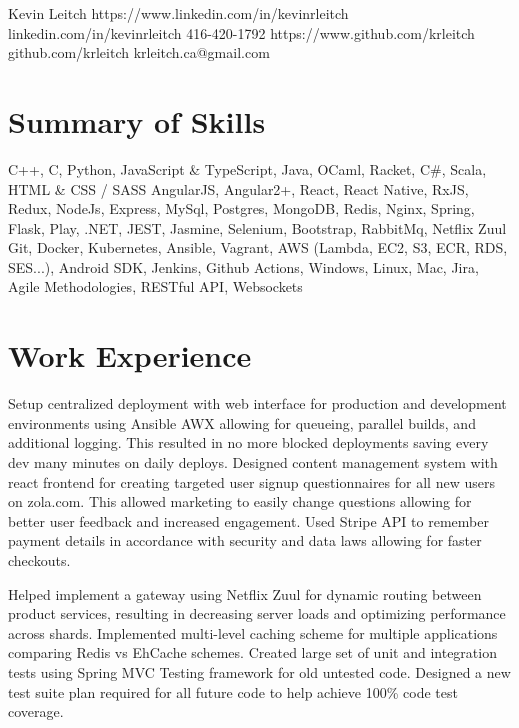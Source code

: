 \documentclass{my_resume}
\begin{document}
\myhead
{Kevin Leitch}
{https://www.linkedin.com/in/kevinrleitch}
{linkedin.com/in/kevinrleitch}
{416-420-1792}
{https://www.github.com/krleitch}
{github.com/krleitch}
{krleitch.ca@gmail.com}


\section{Summary of Skills}
{C++, C, Python, JavaScript \& TypeScript, Java, OCaml, Racket, C\#, Scala, HTML \& CSS / SASS}
{AngularJS, Angular2+, React, React Native, RxJS, Redux, NodeJs, Express, MySql, Postgres,
 MongoDB, Redis, Nginx, Spring, Flask, Play, .NET, JEST, Jasmine, Selenium, Bootstrap, RabbitMq, Netflix Zuul}
{Git, Docker, Kubernetes, Ansible, Vagrant, AWS (Lambda, EC2, S3, ECR, RDS, SES...),
 Android SDK, Jenkins, Github Actions, Windows, Linux, Mac, Jira, Agile Methodologies, RESTful API, Websockets}

\section{Work Experience}

\workitemsthree
{Setup centralized deployment with web interface for production and development environments using Ansible AWX allowing for queueing,
 parallel builds, and additional logging. This resulted in no more blocked deployments saving every dev many minutes on daily deploys.}
{Designed content management system with react frontend for creating targeted user signup questionnaires for all new users on zola.com. This allowed marketing
 to easily change questions allowing for better user feedback and increased engagement.}
{Used Stripe API to remember payment details in accordance with security and data laws allowing for faster checkouts.}

\workitemsthree
{Helped implement a gateway using Netflix Zuul for dynamic routing between product services,
 resulting in decreasing server loads and optimizing performance across shards.}
{Implemented multi-level caching scheme for multiple applications comparing Redis vs EhCache schemes.}
{Created large set of unit and integration tests using Spring MVC Testing framework for old untested code.
 Designed a new test suite plan required for all future code to help achieve 100\% code test coverage.}
\end{document}
